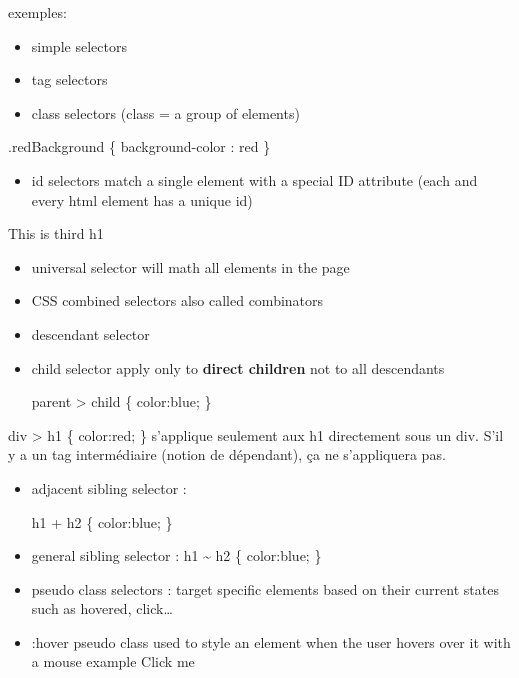 \documentclass[
]{book}
\providecommand{\tightlist}{%
  \setlength{\itemsep}{0pt}\setlength{\parskip}{0pt}}
\begin{document}
exemples:

\begin{itemize}
\tightlist
\item
  simple selectors
\item
  tag selectors
\end{itemize}

\begin{itemize}
\tightlist
\item
  class selectors (class = a group of elements)
\end{itemize}

.redBackground \{
background-color : red
\}

\begin{itemize}
\tightlist
\item
  id selectors
  match a single element with a special ID attribute
  (each and every html element has a unique id)
\end{itemize}

This is third h1

\begin{itemize}
\tightlist
\item
  universal selector
  will math all elements in the page
\end{itemize}

\begin{itemize}
\item
  CSS combined selectors also called combinators
\item
  descendant selector
\end{itemize}

\begin{itemize}
\tightlist
\item
  child selector
  apply only to \textbf{direct children} not to all descendants

  parent \textgreater{} child \{
  color:blue;
  \}
\end{itemize}

div \textgreater{} h1 \{
color:red;
\}
s'applique seulement aux h1 directement sous un div. S'il y a un tag intermédiaire (notion de dépendant), ça ne s'appliquera pas.

\begin{itemize}
\tightlist
\item
  adjacent sibling selector :

  h1 + h2 \{
  color:blue;
  \}
\end{itemize}

\begin{itemize}
\item
  general sibling selector :
  h1 \textasciitilde{} h2 \{
  color:blue;
  \}
\item
  pseudo class selectors :
  target specific elements based on their current states such as hovered, click\ldots{}
\item
  :hover pseudo class used to style an element when the user hovers over it with a mouse
  example
  Click me
\end{itemize}
\end{document}
